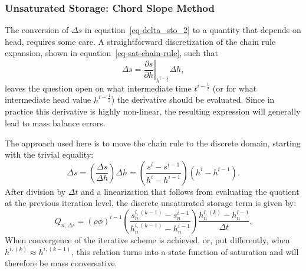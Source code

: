 \documentclass[fleqn]{article}
\begin{document}
\subsubsection*{Unsaturated Storage: Chord Slope Method}
The conversion of $\Delta s$ in equation~\ref{eq-delta_sto_2} to a
quantity that depends on head, requires some care. A straightforward
discretization of the chain rule expansion, shown in 
equation~\ref{eq-sat-chain-rule}, such that
\begin{equation}
  \Delta s = \left.\frac{\partial s}
  {\partial h}\right|_{h^{i-\frac{1}{2}}} \Delta h,
\end{equation}
leaves the question open on what intermediate time $t^{i-\frac{1}{2}}$
(or for what intermediate head value $h^{i-\frac{1}{2}}$)
the derivative should be evaluated. Since in practice this derivative
is highly non-linear, the resulting expression will generally 
lead to mass balance errors.

The approach used here is to move the chain rule to the
discrete domain, starting with the trivial equality:
\begin{equation}
  \Delta s = \left( \frac{\Delta s}{\Delta h} \right) \Delta h
  = \left( \frac{s^i - s^{i-1}}{h^i - h^{i-1}} \right)
  \left( h^i - h^{i-1} \right).
\end{equation}
After division by $\Delta t$ and a linearization that follows
from evaluating the quotient at the previous iteration level,
the discrete unsaturated storage term is given by:
\begin{equation}
  Q_{n,\Delta s} = (\rho \phi)^{i-1}
  \left( \frac{s_n^{i,(k-1)} - s_n^{i-1}}
  {h_n^{i,(k-1)} - h_n^{i-1}} \right)
  \frac{h_n^{i,(k)} - h_n^{i-1}}{\Delta t}.
  \label{eq-unconfined-term-chord-slope}
\end{equation}
When convergence of the iterative scheme is achieved, or, put
differently, when $h^{i,(k)} \approx h^{i,(k-1)}$,
this relation turns into a state function of saturation
and will therefore be mass conversative.
\end{document}
